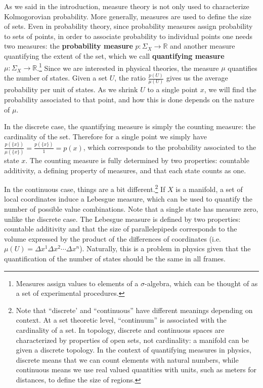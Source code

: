 \documentclass[10pt,twocolumn, nofootinbib]{revtex4-2}
\begin{document}
As we said in the introduction, measure theory is not only used to characterize Kolmogorovian probability. More generally, measures are used to define the size of sets. Even in probability theory, since probability measures assign probability to sets of points, in order to associate probability to individual points one needs two measures: the \textbf{probability measure} $p : \Sigma_X \to \mathbb{R}$ and another measure quantifying the extent of the set, which we call \textbf{quantifying measure} $\mu : \Sigma_X \to \mathbb{R}$.\footnote{Measures assign values to elements of a $\sigma$-algebra, which can be thought of as a set of experimental procedures.} Since we are interested in physical theories, the measure $\mu$ quantifies the number of states. Given a set $U$, the ratio $\frac{p(U)}{\mu(U)}$ gives us the average probability per unit of states. As we shrink $U$ to a single point $x$, we will find the probability associated to that point, and how this is done depends on the nature of $\mu$. 

In the discrete case, the quantifying measure is simply the counting measure: the cardinality of the set. Therefore for a single point we simply have $\frac{p(\{x\})}{\mu(\{x\})} = \frac{p(\{x\})}{1} = p(x)$, which corresponds to the probability associated to the state $x$. The counting measure is fully determined by two properties: countable additivity, a defining property of measures, and that each state counts as one.

In the continuous case, things are a bit different.\footnote{Note that ``discrete' and ``continuous'' have different meanings depending on context. At a set theoretic level, ``continuum'' is associated with the cardinality of a set. In topology, discrete and continuous spaces are characterized by  properties of open sets, not cardinality: a manifold can be given a discrete topology. In the context of quantifying measures in physics, discrete means that we can count elements with natural numbers, while continuous means we use real valued quantities with units, such as meters for distances, to define the size of regions.} If $X$ is a manifold, a set of local coordinates induce a Lebesgue measure, which can be used to quantify the number of possible value combinations. Note that a single state has measure zero, unlike the discrete case. The Lebesgue measure is defined by two properties: countable additivity and that the size of parallelepipeds corresponds to the volume expressed by the product of the differences of coordinates (i.e. $\mu(U) = \Delta x^1 \Delta x^2 \cdots \Delta x^n$). Naturally, this is a problem in physics given that the quantification of the number of states should be the same in all frames.
\end{document}
